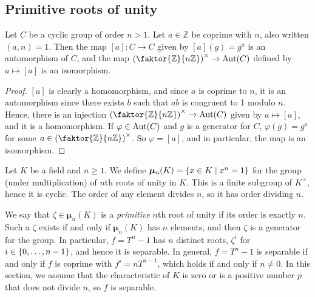 \subsection{Primitive roots of unity}
\begin{lemma}
	Let \( C \) be a cyclic group of order \( n > 1 \).
	Let \( a \in \mathbb Z \) be coprime with \( n \), also written \( (a,n) = 1 \).
	Then the map \( [a] \colon C \to C \) given by \( [a](g) = g^a \) is an automorphism of \( C \), and the map \( \qty(\faktor{\mathbb Z}{n\mathbb Z})^\times \to \Aut(C) \) defined by \( a \mapsto [a] \) is an isomorphism.
\end{lemma}
\begin{proof}
	\( [a] \) is clearly a homomorphism, and since \( a \) is coprime to \( n \), it is an automorphism since there exists \( b \) such that \( ab \) is congruent to 1 modulo \( n \).
	Hence, there is an injection \( \qty(\faktor{\mathbb Z}{n\mathbb Z})^\times \to \Aut(C) \) given by \( a \mapsto [a] \), and it is a homomorphism.
	If \( \varphi \in \operatorname{Aut}(C) \) and \( g \) is a generator for \( C \), \( \varphi(g) = g^a \) for some \( a \in \qty(\faktor{\mathbb Z}{n\mathbb Z})^\times \).
	So \( \varphi = [a] \), and in particular, the map is an isomorphism.
\end{proof}
Let \( K \) be a field and \( n \geq 1 \).
We define \( \bm \mu_n(K) = \qty{x \in K \mid x^n = 1} \) for the group (under multiplication) of \( n \)th roots of unity in \( K \).
This is a finite subgroup of \( K^\times \), hence it is cyclic.
The order of any element divides \( n \), so it has order dividing \( n \).

We say that \( \zeta \in \bm \mu_n(K) \) is a \emph{primitive} \( n \)th root of unity if its order is exactly \( n \).
Such a \( \zeta \) exists if and only if \( \bm \mu_n(K) \) has \( n \) elements, and then \( \zeta \) is a generator for the group.
In particular, \( f = T^n - 1 \) has \( n \) distinct roots, \( \zeta^i \) for \( i \in \qty{0, \dots, n-1} \), and hence it is separable.
In general, \( f = T^n - 1 \) is separable if and only if \( f \) is coprime with \( f' = nT^{n-1} \), which holds if and only if \( n \neq 0 \).
In this section, we assume that the characteristic of \( K \) is zero or is a positive number \( p \) that does not divide \( n \), so \( f \) is separable.

